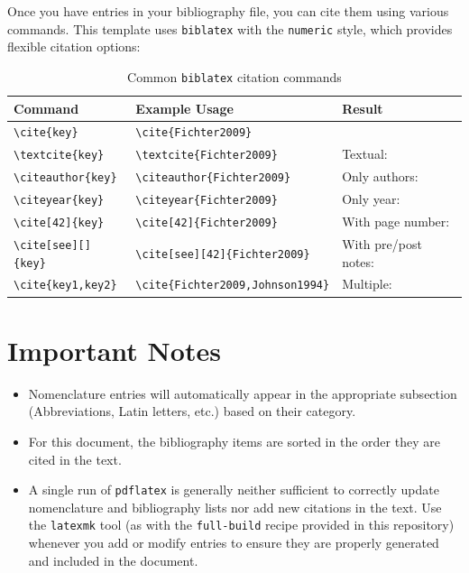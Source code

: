Once you have entries in your bibliography file, you can cite them using various commands. This template uses \texttt{biblatex} with the \texttt{numeric} style, which provides flexible citation options:


\begin{table}[H]
    \centering
    \caption{Common \texttt{biblatex} citation commands}
    \label{tbl:citation-commands}
    \begin{tabular}{lll}
        \toprule
        \textbf{Command} & \textbf{Example Usage} & \textbf{Result} \\
        \midrule
        \texttt{\textbackslash cite\{key\}} & \texttt{\textbackslash cite\{Fichter2009\}} & \cite{Fichter2009} \\
        \texttt{\textbackslash textcite\{key\}} & \texttt{\textbackslash textcite\{Fichter2009\}} & Textual: \textcite{Fichter2009} \\
        \texttt{\textbackslash citeauthor\{key\}} & \texttt{\textbackslash citeauthor\{Fichter2009\}} & Only authors: \citeauthor{Fichter2009} \\
        \texttt{\textbackslash citeyear\{key\}} & \texttt{\textbackslash citeyear\{Fichter2009\}} & Only year: \citeyear{Fichter2009} \\
        \texttt{\textbackslash cite[42]\{key\}} & \texttt{\textbackslash cite[42]\{Fichter2009\}} & With page number: \cite[42]{Fichter2009} \\
        \texttt{\textbackslash cite[see][]\{key\}} & \texttt{\textbackslash cite[see][42]\{Fichter2009\}} & With pre/post notes: \cite[see][42]{Fichter2009} \\
        \texttt{\textbackslash cite\{key1,key2\}} & \texttt{\textbackslash cite\{Fichter2009,Johnson1994\}} & Multiple: \cite{Fichter2009,Johnson1994} \\
        \bottomrule
    \end{tabular}
\end{table}

\section{Important Notes}
\begin{itemize}
    \item Nomenclature entries will automatically appear in the appropriate subsection (Abbreviations, Latin letters, etc.) based on their category.
    \item For this document, the bibliography items are sorted in the order they are cited in the text.
    \item A single run of \texttt{pdflatex} is generally neither sufficient to correctly update nomenclature and bibliography lists nor add new citations in the text.
    Use the \texttt{latexmk} tool (as with the \texttt{full-build} recipe provided in this repository) whenever you add or modify entries to ensure they are properly generated and included in the document.
\end{itemize}